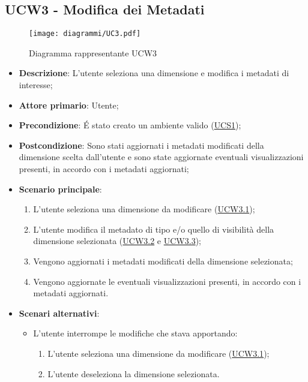 \subsection{UCW3 - Modifica dei Metadati}
\label{sub:ucw3}

\begin{figure}[h]
    \centering
    \texttt{[image: diagrammi/UC3.pdf]}
    \caption{Diagramma rappresentante UCW3}
    \label{fig:UCW3}
\end{figure}

\begin{itemize}
    \item \textbf{Descrizione}: L’utente seleziona una dimensione e modifica i metadati di interesse;
	
    \item \textbf{Attore primario}: Utente;
    
    \item \textbf{Precondizione}:   É stato creato un ambiente valido (\hyperref[sub:ucs1]{UCS1});
    \item \textbf{Postcondizione}:  Sono stati aggiornati i metadati modificati della dimensione scelta dall'utente e 
    sono state aggiornate eventuali visualizzazioni presenti, in accordo con i metadati aggiornati;

	\item \textbf{Scenario principale}:
        \begin{enumerate}
                \item L'utente seleziona una dimensione da modificare (\hyperref[ssub:ucw3.1]{UCW3.1});
                \item L'utente modifica il metadato di tipo e/o quello di visibilità della dimensione selezionata 
                (\hyperref[ssub:ucw3.2]{UCW3.2} e \hyperref[ssub:ucw3.3]{UCW3.3});
                \item Vengono aggiornati i metadati modificati della dimensione selezionata;
                \item Vengono aggiornate le eventuali visualizzazioni presenti, in accordo con i metadati 
                aggiornati.
        \end{enumerate}

    \item \textbf{Scenari alternativi}:
    \begin{itemize}
        \item L'utente interrompe le modifiche che stava apportando:
        \begin{enumerate}
            \item L'utente seleziona una dimensione da modificare (\hyperref[ssub:ucw3.1]{UCW3.1});
            \item L'utente deseleziona la dimensione selezionata.
        \end{enumerate}
    \end{itemize}
\end{itemize}

